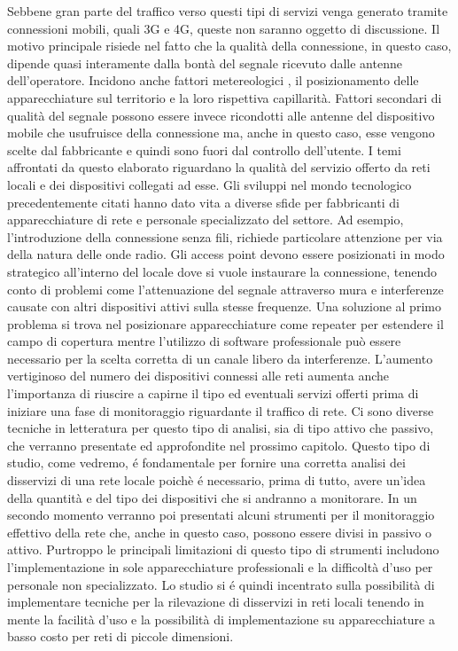 Sebbene gran parte del traffico verso questi tipi di servizi venga generato tramite connessioni mobili, quali 3G e 4G, queste non saranno oggetto di discussione.
Il motivo principale risiede nel fatto che la qualit\`a della connessione, in questo caso, dipende quasi interamente dalla bont\`a del segnale ricevuto dalle antenne dell'operatore.
Incidono anche fattori metereologici \cite{inproceedings}, il posizionamento delle apparecchiature sul territorio e la loro rispettiva capillarit\`a.
Fattori secondari di qualit\`a del segnale possono essere invece ricondotti alle antenne del dispositivo mobile che usufruisce della connessione ma, anche in questo caso, esse vengono scelte dal fabbricante e quindi sono fuori dal controllo dell'utente.
I temi affrontati da questo elaborato riguardano la qualit\`a del servizio offerto da reti locali e dei dispositivi collegati ad esse.
Gli sviluppi nel mondo tecnologico precedentemente citati hanno dato vita a diverse sfide per fabbricanti di apparecchiature di rete e personale specializzato del settore.
Ad esempio, l'introduzione della connessione senza fili, richiede particolare attenzione per via della natura delle onde radio.
Gli access point devono essere posizionati in modo strategico all'interno del locale dove si vuole instaurare la connessione, tenendo conto di problemi come l'attenuazione del segnale attraverso mura \cite{6971137} e interferenze causate con altri dispositivi attivi sulla stesse frequenze.
Una soluzione al primo problema si trova nel posizionare apparecchiature come repeater per estendere il campo di copertura mentre l'utilizzo di software professionale pu\`o essere necessario per la scelta corretta di un canale libero da interferenze.
L'aumento vertiginoso del numero dei dispositivi connessi alle reti aumenta anche l'importanza di riuscire a capirne il tipo ed eventuali servizi offerti prima di iniziare una fase di monitoraggio riguardante il traffico di rete.
Ci sono diverse tecniche in letteratura per questo tipo di analisi, sia di tipo attivo che passivo, che verranno presentate ed approfondite nel prossimo capitolo.
Questo tipo di studio, come vedremo, \'e fondamentale per fornire una corretta analisi dei disservizi di una rete locale poich\`e \'e necessario, prima di tutto, avere un'idea della quantit\`a e del tipo dei dispositivi che si andranno a monitorare.
In un secondo momento verranno poi presentati alcuni strumenti per il monitoraggio effettivo della rete che, anche in questo caso, possono essere divisi in passivo o attivo.
Purtroppo le principali limitazioni di questo tipo di strumenti includono l'implementazione in sole apparecchiature professionali e la difficolt\`a d'uso per personale non specializzato.
Lo studio si \'e quindi incentrato sulla possibilit\`a di implementare tecniche per la rilevazione di disservizi in reti locali tenendo in mente la facilit\`a d'uso e la possibilit\`a di implementazione su apparecchiature a basso costo per reti di piccole dimensioni.

